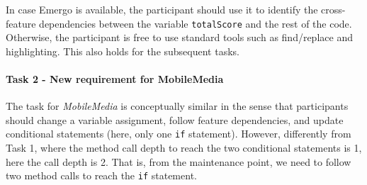 In case Emergo is available, the participant should use it to identify the cross-feature dependencies between the variable \texttt{totalScore} and the rest of the code. Otherwise, the participant is free to use standard tools such as find/replace and  highlighting. This also holds for the subsequent tasks.

\paragraph{Task 2 - New requirement for MobileMedia}

The task for \textit{MobileMedia} is conceptually similar in the sense that participants should change a variable assignment, follow feature dependencies, and update conditional statements (here, only one \texttt{if} statement). However, differently from Task 1, where the method call depth to reach the two conditional statements is 1, here the call depth is 2. That is, from the maintenance point, we need to follow two method calls to reach the \texttt{if} statement.



